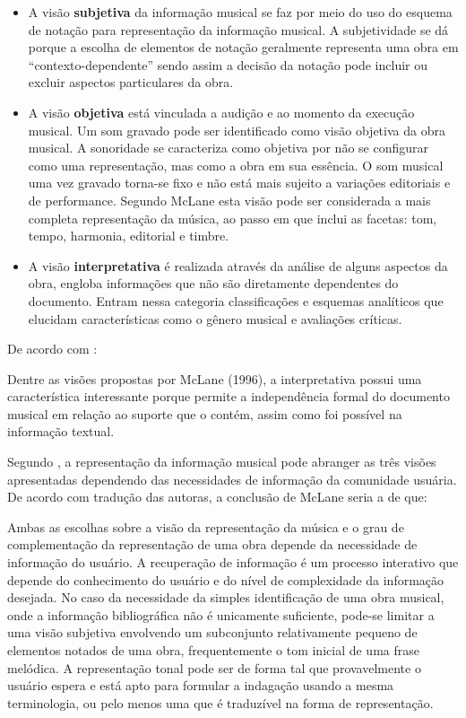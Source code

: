 \begin{itemize}
    \item A visão \textbf{subjetiva} da informação musical se faz por meio do uso do esquema de notação para representação da informação musical. A subjetividade se dá porque a escolha de elementos de notação geralmente representa uma obra em “contexto-dependente” sendo assim a decisão da notação pode incluir ou excluir aspectos particulares da obra.
    \item A visão \textbf{objetiva} está vinculada a audição e ao momento da execução musical. Um som gravado pode ser identificado como visão objetiva da obra musical. A sonoridade se caracteriza como objetiva por não se configurar como uma representação, mas como a obra em sua essência. O som musical uma vez gravado torna-se fixo e não está mais sujeito a variações editoriais e de performance. Segundo McLane esta visão pode ser considerada a mais completa representação da música, ao passo em que inclui as facetas: tom, tempo, harmonia, editorial e timbre.
    \item A visão \textbf{interpretativa} é realizada através da análise de alguns aspectos da obra, engloba informações que não são diretamente dependentes do documento. Entram nessa categoria classificações e esquemas analíticos que elucidam características como o gênero musical e avaliações críticas.
\end{itemize}

De acordo com :

\begin{citacao}
Dentre as visões propostas por McLane (1996), a interpretativa possui uma característica interessante porque permite a independência formal do documento musical em relação ao suporte que o contém, assim como foi possível na informação textual.
\end{citacao}

Segundo , a representação da informação musical pode abranger as três visões apresentadas dependendo das necessidades de informação da comunidade usuária. De acordo com tradução das autoras, a conclusão de McLane seria a de que:

\begin{citacao}
Ambas as escolhas sobre a visão da representação da música e o grau de complementação da representação de uma obra depende da necessidade de informação do usuário. A recuperação de informação é um processo interativo que depende do conhecimento do usuário e do nível de complexidade da informação desejada. No caso da necessidade da simples identificação de uma obra musical, onde a informação bibliográfica não é unicamente suficiente, pode-se limitar a uma visão subjetiva envolvendo um subconjunto relativamente pequeno de elementos notados de uma obra, frequentemente o tom inicial de uma frase melódica. A representação tonal pode ser de forma tal que provavelmente o usuário espera e está apto para formular a indagação usando a mesma terminologia, ou pelo menos uma que é traduzível na forma de representação.
\end{citacao}

